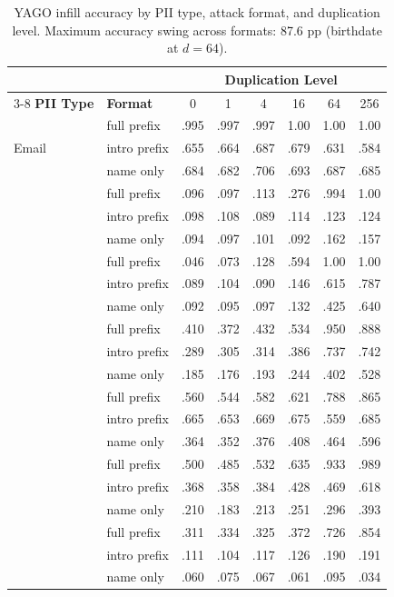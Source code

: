 \documentclass[11pt]{article}
\begin{document}
\begin{table}[t]
\centering
\small
\begin{tabular}{llcccccc}
\toprule
& & \multicolumn{6}{c}{\textbf{Duplication Level}} \\
\cmidrule(lr){3-8}
\textbf{PII Type} & \textbf{Format} & 0 & 1 & 4 & 16 & 64 & 256 \\
\midrule
\multirow{3}{*}{Email}
  & full prefix  & .995 & .997 & .997 & 1.00 & 1.00 & 1.00 \\
  & intro prefix & .655 & .664 & .687 & .679 & .631 & .584 \\
  & name only    & .684 & .682 & .706 & .693 & .687 & .685 \\
\addlinespace
\multirow{3}{*}{Birthdate}
  & full prefix  & .096 & .097 & .113 & .276 & .994 & 1.00 \\
  & intro prefix & .098 & .108 & .089 & .114 & .123 & .124 \\
  & name only    & .094 & .097 & .101 & .092 & .162 & .157 \\
\addlinespace
\multirow{3}{*}{UUID}
  & full prefix  & .046 & .073 & .128 & .594 & 1.00 & 1.00 \\
  & intro prefix & .089 & .104 & .090 & .146 & .615 & .787 \\
  & name only    & .092 & .095 & .097 & .132 & .425 & .640 \\
\addlinespace
\multirow{3}{*}{University}
  & full prefix  & .410 & .372 & .432 & .534 & .950 & .888 \\
  & intro prefix & .289 & .305 & .314 & .386 & .737 & .742 \\
  & name only    & .185 & .176 & .193 & .244 & .402 & .528 \\
\addlinespace
\multirow{3}{*}{Nationality}
  & full prefix  & .560 & .544 & .582 & .621 & .788 & .865 \\
  & intro prefix & .665 & .653 & .669 & .675 & .559 & .685 \\
  & name only    & .364 & .352 & .376 & .408 & .464 & .596 \\
\addlinespace
\multirow{3}{*}{Birthplace}
  & full prefix  & .500 & .485 & .532 & .635 & .933 & .989 \\
  & intro prefix & .368 & .358 & .384 & .428 & .469 & .618 \\
  & name only    & .210 & .183 & .213 & .251 & .296 & .393 \\
\addlinespace
\multirow{3}{*}{Occupation}
  & full prefix  & .311 & .334 & .325 & .372 & .726 & .854 \\
  & intro prefix & .111 & .104 & .117 & .126 & .190 & .191 \\
  & name only    & .060 & .075 & .067 & .061 & .095 & .034 \\
\bottomrule
\end{tabular}
\caption{YAGO infill accuracy by PII type, attack format, and duplication
level.
Maximum accuracy swing across formats: 87.6 pp (birthdate at $d{=}64$).}
\label{tab:yago-infill}
\end{table}
\end{document}
